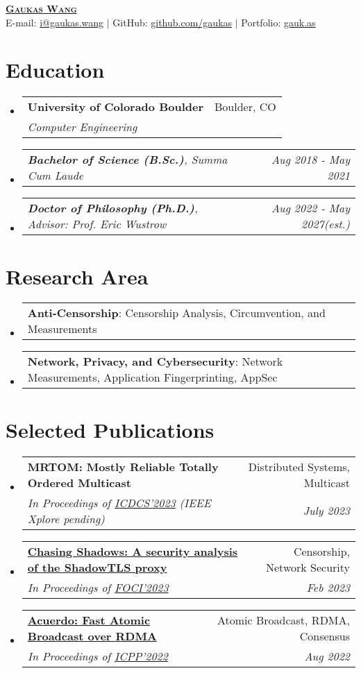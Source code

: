 \documentclass[letterpaper,11pt]{article}
\makeatletter
\newcommand{\resumeSubheading}[4]{
  \vspace{-2pt}\item
    \begin{tabular*}{0.97\textwidth}[t]{l@{\extracolsep{\fill}}r}
      \textbf{#1} & #2 \\
      \textit{\small#3} & \textit{\small #4} \\
    \end{tabular*}\vspace{-7pt}
}
\newcommand{\resumeSubSubheading}[2]{
    \item
    \begin{tabular*}{0.97\textwidth}{l@{\extracolsep{\fill}}r}
      \textit{\small#1} & \textit{\small #2} \\
    \end{tabular*}\vspace{-7pt}
}
\newcommand{\resumeProjectHeading}[2]{
    \item
    \begin{tabular*}{0.97\textwidth}{l@{\extracolsep{\fill}}r}
      \small#1 & #2 \\
    \end{tabular*}\vspace{-7pt}
}
\newcommand{\resumeSubHeadingListStart}{\begin{itemize}[leftmargin=0.15in, label={}]}
\newcommand{\resumeSubHeadingListEnd}{\end{itemize}}
\makeatother
\begin{document}
\begin{center}
  \href{https://gaukas.wang}{\textbf{\Huge \scshape Gaukas Wang}} \\ \vspace{1pt}
    E-mail: \href{mailto:i@gaukas.wang}{{i@gaukas.wang}} $|$ 
    GitHub: \href{https://github.com/gaukas}{{github.com/gaukas}} $|$ 
    Portfolio: \href{https://gauk.as}{gauk.as}
\end{center}


\section{Education}
\resumeSubHeadingListStart
\resumeSubheading
{University of Colorado Boulder}{Boulder, CO}
{Computer Engineering}{}
\resumeSubSubheading
{\textbf{Bachelor of Science (B.Sc.)}, \em{Summa Cum Laude}}{Aug 2018 - May 2021}
\resumeSubSubheading
{\textbf{Doctor of Philosophy (Ph.D.)}, \em{Advisor: Prof. Eric Wustrow}}{Aug 2022 - May 2027\textit{(est.)}}
\resumeSubHeadingListEnd

\vspace{1pt}

\section{Research Area}
\resumeSubHeadingListStart

\resumeProjectHeading
{\textbf{Anti-Censorship}: Censorship Analysis, Circumvention, and Measurements}{}

\resumeProjectHeading
{\textbf{Network, Privacy, and Cybersecurity}: Network Measurements, Application Fingerprinting, AppSec}{}

\resumeSubHeadingListEnd
\vspace{1pt}

\section{Selected Publications}
\resumeSubHeadingListStart
  \resumeSubheading
  {\textbf{{MRTOM}: Mostly Reliable Totally Ordered Multicast}}{Distributed Systems, Multicast}
  {In Proceedings of \href{https://icdcs2023.icdcs.org/}{ICDCS'2023} (IEEE Xplore pending)}{July 2023}
  \resumeSubheading
  {\href{https://www.petsymposium.org/foci/2023/foci-2023-0002.php}{\textbf{{Chasing Shadows}: A security analysis of the {ShadowTLS} proxy}}}{Censorship, Network Security}
  {In Proceedings of \href{https://foci.community/foci23.html}{FOCI'2023}}{Feb 2023}
  \resumeSubheading
  {\href{https://dl.acm.org/doi/abs/10.1145/3545008.3545041}{\textbf{Acuerdo: Fast Atomic Broadcast over {RDMA}}}}{Atomic Broadcast, RDMA, Consensus}
  {In Proceedings of \href{https://icpp22.gitlabpages.inria.fr/}{ICPP'2022}}{Aug 2022}
\resumeSubHeadingListEnd
\vspace{1pt}
\end{document}
